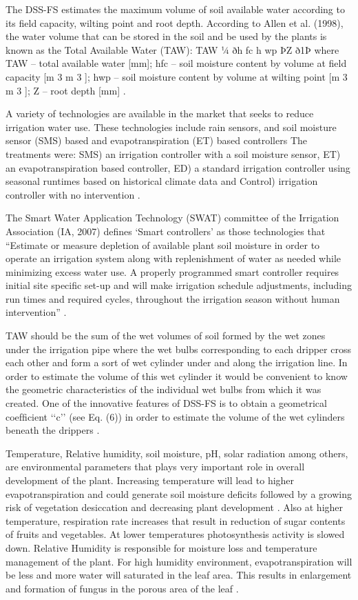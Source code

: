 \documentclass[letterpaper, 10 pt, conference]{ieeeconf}  %
\begin{document}
The DSS-FS estimates the maximum volume of soil available water according to its ﬁeld capacity, wilting point and root depth. According to Allen et al. (1998),
the water volume that can be stored in the soil and be used by the plants is known as the Total Available Water (TAW): TAW ¼ ðh fc h wp ÞZ ð1Þ where TAW – total available water [mm]; hfc – soil moisture content by volume at ﬁeld capacity [m 3 m 3 ]; hwp – soil moisture content by volume at wilting point [m 3 m 3 ]; Z – root depth [mm] \cite{Barradas2012}.

A variety of technologies are available in the market that seeks to reduce irrigation water use. These technologies include rain sensors, and soil moisture sensor (SMS) based and evapotranspiration (ET) based controllers The treatments were: SMS) an irrigation controller with a soil moisture sensor, ET) an evapotranspiration based controller, ED) a standard irrigation controller using seasonal runtimes based on historical climate data and Control) irrigation controller with no intervention \cite{nautiyal2010evaluation}.

The Smart Water Application Technology (SWAT) committee of the Irrigation Association (IA, 2007) defines ‘Smart controllers’ as those technologies that “Estimate or measure depletion of available plant soil moisture in order to operate an irrigation system along with replenishment of water as needed while minimizing excess water use. A properly programmed smart controller requires initial site specific set-up and will make irrigation schedule adjustments, including run times and required cycles, throughout the irrigation season without human intervention” \cite{nautiyal2010evaluation}. 

TAW should be the sum of the wet volumes of soil formed by the wet zones under the irrigation pipe where the wet bulbs corresponding to each dripper cross each other and form a sort of wet cylinder under and along the irrigation line. In order to estimate the volume of this wet cylinder it would be convenient to know the geometric characteristics of the individual wet bulbs from which it was created. One of the innovative features of DSS-FS is to obtain a geometrical coefﬁcient ‘‘c’’ (see Eq. (6)) in order to estimate the volume of the wet cylinders beneath the drippers \cite{Barradas2012}.


Temperature, Relative humidity, soil moisture, pH, solar radiation among others, are environmental parameters that plays very important role in overall development of the plant. Increasing temperature will lead to higher evapotranspiration and could generate soil moisture deficits followed by a growing risk of vegetation desiccation and decreasing plant development \cite{riediger2016modelling}. Also at higher temperature, respiration rate increases that result in reduction of sugar contents of fruits and vegetables. At lower temperatures photosynthesis activity is slowed down. Relative Humidity is responsible for moisture loss and temperature management of the plant. For high humidity environment, evapotranspiration will be less and more water will saturated in the leaf area. This results in enlargement and formation of fungus in the porous area of the leaf \cite{Gawali}.\\ 
\end{document}
